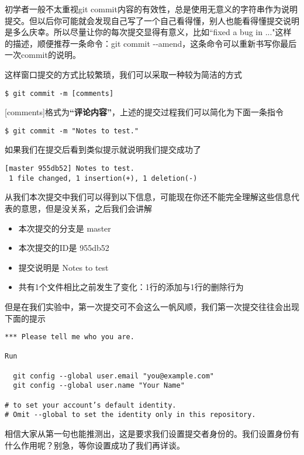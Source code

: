 \begin{note}
初学者一般不太重视git commit内容的有效性，总是使用无意义的字符串作为说明提交。但以后你可能就会发现自己写了一个自己看得懂，别人也能看得懂提交说明是多么庆幸。所以尽量让你的每次提交显得有意义，比如“fixed a bug in ..."这样的描述，顺便推荐一条命令：git commit -{}-amend，这条命令可以重新书写你最后一次commit的说明。
\end{note}

这样窗口提交的方式比较繁琐，我们可以采取一种较为简洁的方式\label{git commit}
\begin{verbatim}
$ git commit -m [comments]
\end{verbatim}

[comments]格式为\textbf{“评论内容”}，上述的提交过程我们可以简化为下面一条指令

\begin{verbatim}
$ git commit -m "Notes to test."
\end{verbatim}

如果我们在提交后看到类似提示就说明我们提交成功了

\begin{verbatim}
[master 955db52] Notes to test.
 1 file changed, 1 insertion(+), 1 deletion(-)
\end{verbatim}
从我们本次提交中我们可以得到以下信息，可能现在你还不能完全理解这些信息代表的意思，但是没关系，之后我们会讲解

\begin{itemize}
\item 本次提交的分支\label{分支}是 master
\item 本次提交的ID是 955db52
\item 提交说明是 Notes to test
\item 共有1个文件相比之前发生了变化：1行的添加与1行的删除行为
\end{itemize}

但是在我们实验中，第一次提交可不会这么一帆风顺，我们第一次提交往往会出现下面的提示

\begin{verbatim}
*** Please tell me who you are.

Run

  git config --global user.email "you@example.com"
  git config --global user.name "Your Name"

# to set your account’s default identity.
# Omit --global to set the identity only in this repository.
\end{verbatim}

相信大家从第一句也能推测出，这是要求我们设置提交者身份的。我们设置身份有什么作用呢？别急，等你设置成功了我们再详谈。

